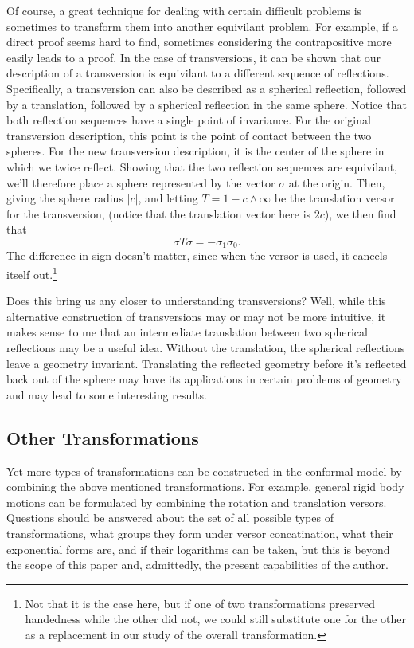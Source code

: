 \documentclass[12pt]{article}
\newcommand{\nvai}{\infty}
\begin{document}
Of course, a great technique for dealing with certain difficult problems is sometimes
to transform them into another equivilant problem.  For example, if a direct proof seems hard to find,
sometimes considering the contrapositive more easily leads to a proof.  In the case
of transversions, it can be shown that our description of a transversion is equivilant
to a different sequence of reflections.  Specifically, a transversion can also be described
as a spherical reflection, followed by a translation, followed by a spherical reflection
in the same sphere.  Notice that both reflection sequences have a single
point of invariance.  For the original transversion description, this point is the
point of contact between the two spheres.  For the new transversion description,
it is the center of the sphere in which we twice reflect.  Showing that the two
reflection sequences are equivilant, we'll therefore place a sphere represented
by the vector $\sigma$ at the origin.  Then, giving the sphere radius $|c|$,
and letting $T=1-c\wedge\nvai$ be the translation versor for the transversion, (notice that the translation
vector here is $2c$), we then find that
\begin{equation*}
\sigma T\sigma = -\sigma_1\sigma_0.
\end{equation*}
The difference in sign doesn't matter, since when the versor is used, it cancels itself
out.\footnote{Not that it is the case here, but if one of two transformations preserved
handedness while the other did not, we could still substitute one for the other as a replacement
in our study of the overall transformation.}

Does this bring us any closer to understanding transversions?  Well, while this alternative
construction of transversions may or may not be more intuitive, it makes sense to me
that an intermediate translation between two spherical reflections may be a useful idea.
Without the translation, the spherical reflections leave a geometry invariant.  Translating
the reflected geometry before it's reflected back out of the sphere may have its applications
in certain problems of geometry and may lead to some interesting results.

\subsection{Other Transformations}

Yet more types of transformations can be constructed in the conformal model
by combining the above mentioned transformations.  For example, general
rigid body motions can be formulated by combining the rotation and translation
versors.  Questions should be answered about the set of all possible types
of transformations, what groups they form under versor concatination, what
their exponential forms are, and if their logarithms can be taken, but
this is beyond the scope of this paper and, admittedly, the present capabilities of the author.
\end{document}
